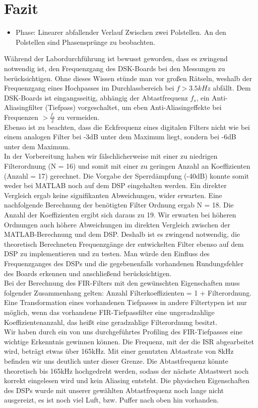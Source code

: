 \section{Fazit}
\begin{itemize}
	\item Phase: Linearer abfallender Verlauf Zwischen zwei Polstellen. An den Polstellen sind Phasensprünge zu beobachten.
\end{itemize}
\noindent Während der Labordurchführung ist bewusst geworden, dass es zwingend notwendig ist, den Frequenzgang des DSK-Boards bei den Messungen zu berücksichtigen. Ohne dieses Wissen stünde man vor großen Rätseln, weshalb der Frequenzgang eines Hochpasses im Durchlassbereich bei $f>3.5kHz$ abfällt. Dem DSK-Boards ist eingangsseitig, abhängig der Abtastfrequenz $f_s$, ein Anti-Aliasingfilter (Tiefpass) vorgeschaltet, um eben Anti-Aliasingeffekte bei Frequenzen $>\frac{f_s}{2}$ zu vermeiden.\\
\noindent Ebenso ist zu beachten, dass die Eckfrequenz eines digitalen Filters nicht wie bei einem analogen Filter bei -3dB unter dem Maximum liegt, sondern bei -6dB unter dem Maximum.\\
\noindent In der Vorbereitung haben wir fälschlicherweise mit einer zu niedrigen Filterordnung (N = 16) und somit mit einer zu geringen Anzahl an Koeffizienten (Anzahl = 17) gerechnet. Die Vorgabe der Sperrdämpfung (-40dB) konnte somit weder bei MATLAB noch auf dem DSP eingehalten werden. Ein direkter Vergleich ergab keine signifikanten Abweichungen, wider erwarten. Eine nachfolgende Berechnung der benötigten Filter Ordnung ergab N = 18. Die Anzahl der Koeffizienten ergibt sich daraus zu 19. Wir erwarten bei höheren Ordnungen auch höhere Abweichungen im direkten Vergleich zwischen der MATLAB-Berechnung und dem DSP. Deshalb ist es zwingend notwendig, die theoretisch Berechneten Frequenzgänge der entwickelten Filter ebenso auf dem DSP zu implementieren und zu testen. Man würde den Einfluss des Frequenzganges des DSPs und die gegebenenfalls vorhandenen Rundungsfehler des Boards erkennen und anschließend berücksichtigen.\\
\noindent Bei der Berechnung des FIR-Filters mit den gewünschten Eigenschaften muss folgender Zusammenhang gelten: Anzahl Filterkoeffizienten = 1 + Filterordnung. Eine Transformation eines vorhandenen Tiefpasses in andere Filtertypen ist nur möglich, wenn das vorhandene FIR-Tiefpassfilter eine ungeradzahlige Koeffizientenanzahl, das heißt eine geradzahlige Filterordnung besitzt.\\
\noindent Wir haben durch ein von uns durchgeführtes Profiling des FIR-Tiefpasses eine wichtige Erkenntnis gewinnen können. Die Frequenz, mit der die ISR abgearbeitet wird, beträgt etwas über 165kHz. Mit einer genutzten Abtastrate von 8kHz befinden wir uns deutlich unter dieser Grenze. Die Abtastfrequenz könnte theoretisch bis 165kHz hochgedreht werden, sodass der nächste Abtastwert noch korrekt eingelesen wird und kein Aliasing entsteht. Die physischen Eigenschaften des DSPs wurde mit unserer gewählten Abtastfrequenz noch lange nicht ausgereizt, es ist noch viel Luft, bzw. Puffer nach oben hin vorhanden. 
